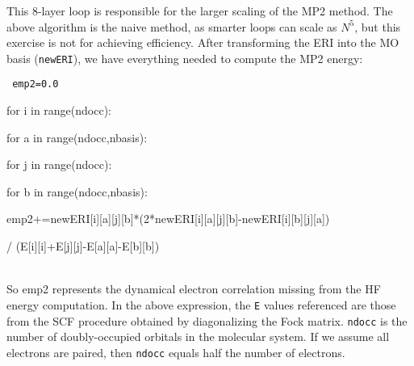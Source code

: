 \documentclass[12pt]{article}
\begin{document}
\noindent
This 8-layer loop is responsible for the larger scaling of the MP2 method.
The above algorithm is the naive method, as smarter loops can
scale as $N^5$, but this exercise is not for achieving efficiency.
After transforming the ERI into the MO basis ({\tt newERI}),
we have everything needed to compute the MP2 energy:
\\

{\tt
\hspace{0.15in}emp2=0.0

\hspace{0.15in}for i in range(ndocc):

\hspace{0.3in}for a in range(ndocc,nbasis):

\hspace{0.45in}for j in range(ndocc):

\hspace{0.6in}for b in range(ndocc,nbasis):

\hspace{0.75in}emp2+=newERI[i][a][j][b]*(2*newERI[i][a][j][b]-newERI[i][b][j][a])

\hspace{1.1in} / (E[i][i]+E[j][j]-E[a][a]-E[b][b])
}
\\

\noindent
So emp2 represents the dynamical electron correlation missing from the HF energy
computation. In the above expression, the {\tt E} values referenced are those
from the SCF procedure obtained by diagonalizing the Fock matrix. {\tt ndocc}
is the number of doubly-occupied orbitals in the molecular system. If we
assume all electrons are paired, then {\tt ndocc} equals half the number of 
electrons.
\end{document}

